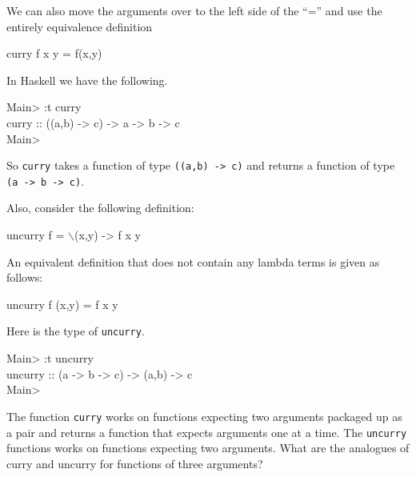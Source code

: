 \documentclass[11pt]{article}
\begin{document}
We can also move the arguments over to the left side of the ``='' and use the
entirely equivalence definition
\begin{program*}
  \> curry f x y  = f(x,y)
\end{program*}


In Haskell we have the following.

\begin{program*}
  \> Main> :t curry \\
  \> curry :: ((a,b) -> c) -> a -> b -> c \\
  \> Main>  \\
\end{program*}
So {\tt{curry}} takes a function of type {\tt{((a,b) -> c)}} and returns a function of type {\tt{(a -> b -> c)}}.

Also, consider the following definition: %

\begin{program*}
\> uncurry f = $\backslash$(x,y) ->  f x y    \\
\end{program*}

An equivalent definition that does not contain any lambda terms is given as
follows:

\begin{program*}
\> uncurry f (x,y) = f x y    \\
\end{program*}


Here is the type of {\tt{uncurry}}.

\begin{program*}
\> Main> :t uncurry \\ 
\> uncurry :: (a -> b -> c) -> (a,b) -> c \\ 
\> Main>  \\ 
\end{program*}


The function {\tt{curry}} works on functions expecting two arguments packaged
 up as a pair and returns a function that expects arguments one at a time. The
 {\tt{uncurry}} functions works on functions expecting two arguments.  What are
 the analogues of curry and uncurry for functions of three arguments?

\end{document}
